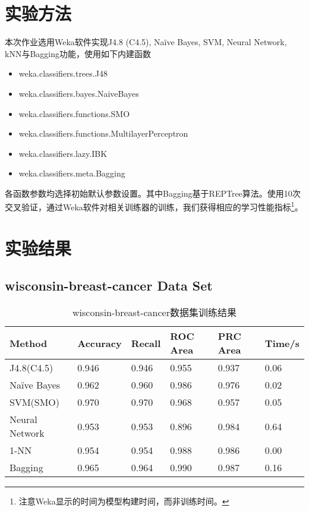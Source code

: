 \documentclass[a4paper,UTF8]{article}
\numberwithin{equation}{section}
\begin{document}
\section{实验方法}
本次作业选用Weka软件实现J4.8 (C4.5), Naïve Bayes, SVM, Neural Network, kNN与Bagging功能，使用如下内建函数
\begin{itemize}
\item weka.classifiers.trees.J48
\item weka.classifiers.bayes.NaiveBayes
\item weka.classifiers.functions.SMO
\item weka.classifiers.functions.MultilayerPerceptron
\item weka.classifiers.lazy.IBK
\item weka.classifiers.meta.Bagging
\end{itemize}
各函数参数均选择初始默认参数设置。其中Bagging基于REPTree算法。使用10次交叉验证，通过Weka软件对相关训练器的训练，我们获得相应的学习性能指标\footnote{注意Weka显示的时间为模型构建时间，而非训练时间。}。

\section{实验结果}
\subsection{wisconsin-breast-cancer Data Set}
\begin{table}[H]
\centering
\caption{wisconsin-breast-cancer数据集训练结果}
\label{my-label}
\begin{tabular}{l|lllll}
\hline
Method         & Accuracy & Recall & ROC Area & PRC Area & Time/s \\ \hline
J4.8(C4.5)     & 0.946    & 0.946  & 0.955    & 0.937    & 0.06   \\ \hline
Naïve Bayes   & 0.962    & 0.960  & 0.986    & 0.976    & 0.02   \\ \hline
SVM(SMO)       & 0.970    & 0.970  & 0.968    & 0.957    & 0.05   \\ \hline
Neural Network & 0.953    & 0.953  & 0.896    & 0.984    & 0.64   \\ \hline
1-NN           & 0.954    & 0.954  & 0.988    & 0.986    & 0.00   \\ \hline
Bagging        & 0.965    & 0.964  & 0.990    & 0.987    & 0.16   \\ \hline
\end{tabular}
\end{table}
\end{document}
